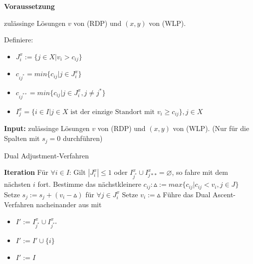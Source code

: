         \par \textbf{Voraussetzung}
        \par zulässinge Lösungen $v$ von (RDP) und $(x, y)$ von (WLP).

        Definiere:
        \begin{itemize}
          \item $J_i^x := \{j \in X | v_i > c_{ij}\}$
          \item $c_{ij^*} = min\{c_{ij} | j \in J_i^x\}$
          \item $c_{ij^{**}} = min\{c_{ij} | j \in J_i^x, j \neq j^*\}$
          \item $I_j^x = \{i \in I | j \in X \text{ ist der einzige Standort mit } v_i \geq c_{ij}\}, j \in X$ 
        \end{itemize}
        
        

        \begin{algorithm}[H]
          \textbf{Input:} zulässinge Lösungen $v$ von (RDP) und $(x, y)$ von (WLP). (Nur für die Spalten mit $s_j = 0$ durchführen)
          \begin{algorithmic}[1]
            \caption{Dual Adjustment-Verfahren}
            \State \textbf{Iteration}
            \State Für $\forall i \in I$:
            \State Gilt $|J_i^x| \leq 1$ oder $I_{j^*}^x \cup I_{j**}^x = \varnothing$, so fahre mit dem nächsten $i$ fort.
            \State Bestimme das nächstkleinere $c_{ij}: \vartriangle := max\{c_{ij}|c_{ij} < v_i, j \in J\}$
            \State Setze $s_j := s_j + (v_i - \vartriangle)$ für $\forall j \in J_i^x$
            \State Setze $v_i:= \vartriangle$
            \State Führe das Dual Ascent-Verfahren nacheinander aus mit
            \begin{itemize}
              \item $I':=I_{j^*}^x \cup I_{j^{**}}^x$
              \item $I':= I' \cup \{i\}$
              \item $I':= I$
            \end{itemize}

            \end{algorithmic}
        \end{algorithm}

      \begin{exmp}
        
      \end{exmp}

